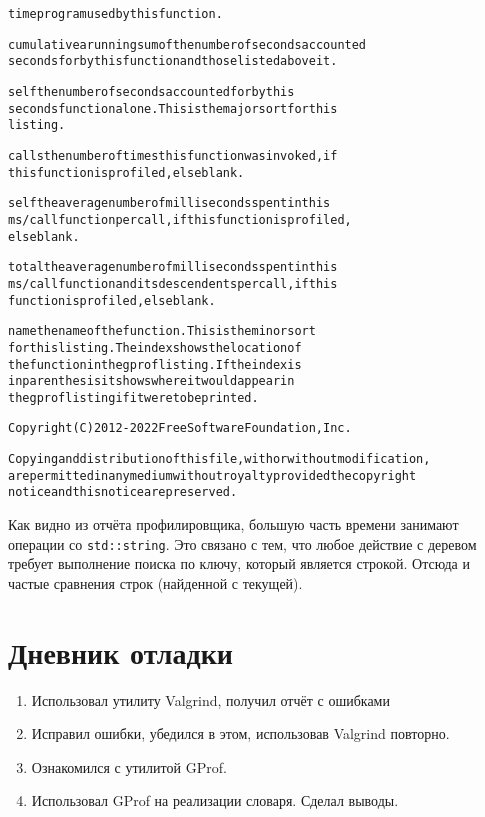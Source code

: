 \begin{alltt}
	%         the percentage of the total running time of the
time       program used by this function.

cumulative a running sum of the number of seconds accounted
	seconds   for by this function and those listed above it.

	self      the number of seconds accounted for by this
seconds    function alone.  This is the major sort for this
			listing.

calls      the number of times this function was invoked, if
			this function is profiled, else blank.

	self      the average number of milliseconds spent in this
ms/call    function per call, if this function is profiled,
			else blank.

	total     the average number of milliseconds spent in this
ms/call    function and its descendents per call, if this
			function is profiled, else blank.

name       the name of the function.  This is the minor sort
			for this listing. The index shows the location of
			the function in the gprof listing. If the index is
			in parenthesis it shows where it would appear in
			the gprof listing if it were to be printed.


Copyright (C) 2012-2022 Free Software Foundation, Inc.

Copying and distribution of this file, with or without modification,
are permitted in any medium without royalty provided the copyright
notice and this notice are preserved.
\end{alltt}

Как видно из отчёта профилировщика, большую часть времени занимают операции со {\tt std::string}. Это связано с тем, что любое
действие с деревом требует выполнение поиска по ключу, который является строкой. Отсюда и частые сравнения строк (найденной с
текущей).

\pagebreak

\section{Дневник отладки}

\begin{enumerate}
	\item Использовал утилиту Valgrind, получил отчёт с ошибками
	\item Исправил ошибки, убедился в этом, использовав Valgrind повторно.
	\item Ознакомился с утилитой GProf.
	\item Использовал GProf на реализации словаря. Сделал выводы.
\end{enumerate}

\pagebreak
